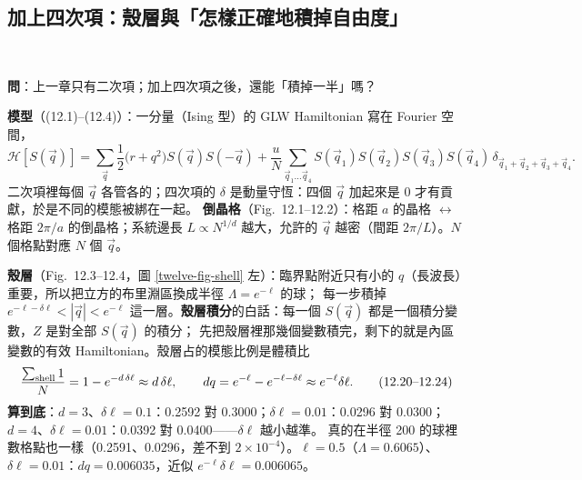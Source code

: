 \subsection{加上四次項：殼層與「怎樣正確地積掉自由度」}
\leavevmode{}\ \par\nopagebreak

\textbf{問}：上一章只有二次項；加上四次項之後，還能「積掉一半」嗎？

\textbf{模型}（(12.1)--(12.4)）：一分量（Ising 型）的 GLW Hamiltonian 寫在 Fourier 空間，
\[\mathcal H[S(\vec q)]=\sum_{\vec q}\frac12\big(r+q^2\big)S(\vec q)S(-\vec q)+\frac uN\sum_{\vec q_1\ldots\vec q_4}S(\vec q_1)S(\vec q_2)S(\vec q_3)S(\vec q_4)\,\delta_{\vec q_1+\vec q_2+\vec q_3+\vec q_4}.\tag{12.3--12.4}\]
二次項裡每個 $\vec q$ 各管各的；四次項的 $\delta$ 是動量守恆：四個 $\vec q$ 加起來是 0 才有貢獻，於是不同的模態被綁在一起。
\textbf{倒晶格}（Fig.~12.1--12.2）：格距 $a$ 的晶格 $\leftrightarrow$ 格距 $2\pi/a$ 的倒晶格；系統邊長 $L\propto N^{1/d}$ 越大，允許的 $\vec q$ 越密（間距 $2\pi/L$）。$N$ 個格點對應 $N$ 個 $\vec q$。

\textbf{殼層}（Fig.~12.3--12.4，圖 \ref{twelve-fig-shell} 左）：臨界點附近只有小的 $q$（長波長）重要，所以把立方的布里淵區換成半徑 $\Lambda=e^{-\ell}$ 的球；
每一步積掉 $e^{-\ell-\delta\ell}<|\vec q|<e^{-\ell}$ 這一層。\textbf{殼層積分}的白話：每一個 $S(\vec q)$ 都是一個積分變數，$Z$ 是對全部 $S(\vec q)$ 的積分；
先把殼層裡那幾個變數積完，剩下的就是內區變數的有效 Hamiltonian。殼層占的模態比例是體積比
\[\frac{\sum_{\rm shell}1}{N}=1-e^{-d\,\delta\ell}\approx d\,\delta\ell,\qquad dq=e^{-\ell}-e^{-\ell-\delta\ell}\approx e^{-\ell}\delta\ell .\tag{12.20--12.24}\]
\textbf{算到底}：$d=3$、$\delta\ell=0.1$：0.2592 對 0.3000；$\delta\ell=0.01$：0.0296 對 0.0300；$d=4$、$\delta\ell=0.01$：0.0392 對 0.0400——$\delta\ell$ 越小越準。
真的在半徑 200 的球裡數格點也一樣（0.2591、0.0296，差不到 $2\times10^{-4}$）。$\ell=0.5$（$\Lambda=0.6065$）、$\delta\ell=0.01$：$dq=0.006035$，近似 $e^{-\ell}\delta\ell=0.006065$。

